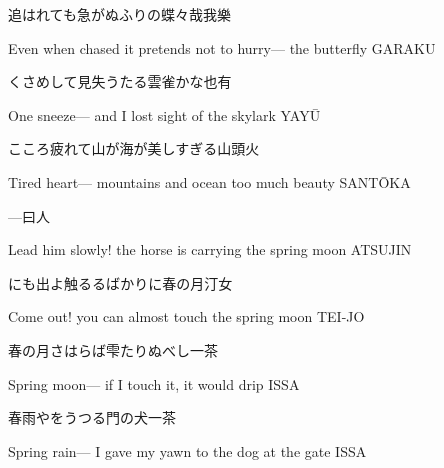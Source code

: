 \begin{haiku}
    {\FH 追はれても急がぬふりの蝶々哉}\hfill{\FH 我樂}

    \vin{} Even when chased
    \vin{} \vin{} it pretends not to hurry---
    \vin{} \vin{} \vin{} the butterfly \hspace{\fill} GARAKU
\end{haiku}

\begin{haiku}
    {\FH くさめして見失うたる雲雀かな}\hfill{\FH 也有}

    \vin{} One sneeze---
    \vin{} \vin{} and I lost sight of
    \vin{} \vin{} \vin{} the skylark \hspace{\fill} YAY\={U}
\end{haiku}

\begin{haiku}
    {\FH こころ疲れて山が海が美しすぎる}\hfill{\FH 山頭火}

    \vin{} Tired heart---
    \vin{} \vin{} mountains and ocean
    \vin{} \vin{} \vin{} too much beauty \hspace{\fill} SANT\={O}KA
\end{haiku}

\begin{haiku}
    {---}\hfill{\FH 曰人}

    \vin{} Lead him slowly!
    \vin{} \vin{} the horse is carrying
    \vin{} \vin{} \vin{} the spring moon \hspace{\fill} ATSUJIN
\end{haiku}

\begin{haiku}
    {\FH {}にも出よ触るるばかりに春の月}\hfill{\FH 汀女}

    \vin{} Come out!
    \vin{} \vin{} you can almost touch
    \vin{} \vin{} \vin{} the spring moon \hspace{\fill} TEI-JO
\end{haiku}

\begin{haiku}
    {\FH 春の月さはらば雫たりぬべし}\hfill{\FH 一茶}

    \vin{} Spring moon---
    \vin{} \vin{} if I touch it, it would
    \vin{} \vin{} \vin{} drip \hspace{\fill} ISSA
\end{haiku}

\begin{haiku}
    {\FH 春雨やをうつる門の犬}\hfill{\FH 一茶}

    \vin{} Spring rain---
    \vin{} \vin{} I gave my yawn
    \vin{} \vin{} \vin{} to the dog at the gate \hspace{\fill} ISSA
\end{haiku}


